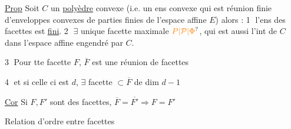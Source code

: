 \uline{Prop} Soit $C$ un \uline{polyèdre} convexe (i.e. un ens
convexe qui est réunion finie d'enveloppes
 convexes de parties finies de l'espace affine
$E$)
alors : \textcircled{1} l'ens des facettes est \uline{fini}. \textcircled{2} $\exists$ unique
facette maximale $\unsure{P|\mathcal P|\Phi}$, qui est aussi l'int de $C$ dans l'espace
affine engendré par $C$.

\textcircled{3} Pour tte facette $F$, $\overline F$ est une réunion de
facettes 

\textcircled{4} et si celle ci est $d$, $\exists$ facette $\subset\overline F$ de dim $d-1$

\uline{Cor} Si $F,F'$ sont des facettes, $\overline F=\overline{F'}\Rightarrow F=F'$

Relation d'ordre entre facettes
